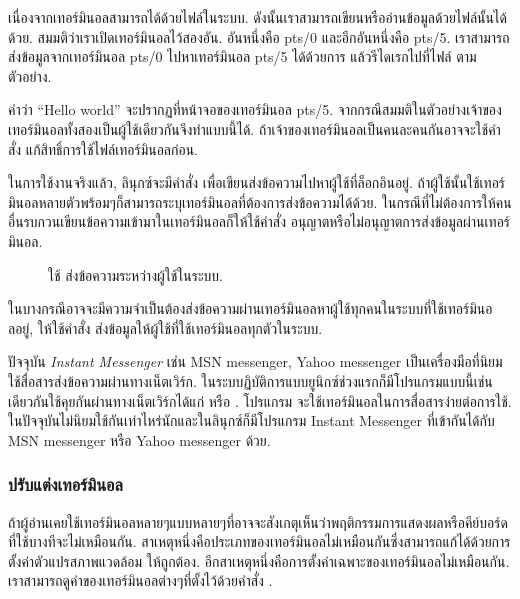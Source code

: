 \begin{thwbr}
เนื่องจากเทอร์มินอลสามารถได้ด้วยไฟล์ในระบบ. ดังนั้นเราสามารถเขียนหรืออ่านข้อมูลด้วยไฟล์นั้นได้ด้วย. สมมติว่าเราเปิดเทอร์มินอลไว้สองอัน. อันหนึ่งคือ pts/0 และอีกอันหนึ่งคือ pts/5. เราสามารถส่งข้อมูลจากเทอร์มินอล pts/0 ไปหาเทอร์มินอล pts/5 ได้ด้วยการ  แล้วรีไดเรกไปที่ไฟล์  ตามตัวอย่าง.
\begin{MyExample}
\end{MyExample}%
คำว่า ``Hello world'' จะปรากฏที่หน้าจอของเทอร์มินอล pts/5. จากกรณีสมมติในตัวอย่างเจ้าของเทอร์มินอลทั้งสองเป็นผู้ใช้เดียวกันจึงทำแบบนี้ได้. ถ้าเจ้าของเทอร์มินอลเป็นคนละคนกันอาจจะใช้คำสั่ง  แก้สิทธิ์การใช้ไฟล์เทอร์มินอลก่อน. 

ในการใช้งานจริงแล้ว, ลินุกซ์จะมีคำสั่ง  เพื่อเขียนส่งข้อความไปหาผู้ใช้ที่ล็อกอินอยู่. ถ้าผู้ใช้นั้นใช้เทอร์มินอลหลายตัวพร้อมๆก็สามารถระบุเทอร์มินอลที่ต้องการส่งข้อความได้ด้วย. ในกรณีที่ไม่ต้องการให้คนอื่นรบกวนเขียนข้อความเข้ามาในเทอร์มินอลก็ให้ใช้คำสั่ง  อนุญาตหรือไม่อนุญาตการส่งข้อมูลผ่านเทอร์มินอล.

\begin{figure}[!htb]

\vspace{10pt}
\caption{ใช้  ส่งข้อความระหว่างผู้ใช้ในระบบ.}\label{fig:write}
\end{figure}

ในบางกรณีอาจจะมีความจำเป็นต้องส่งข้อความผ่านเทอร์มินอลหาผู้ใช้ทุกคนในระบบที่ใช้เทอร์มินอลอยู่, ให้ใช้คำสั่ง  ส่งข้อมูลให้ผู้ใช้ที่ใช้เทอร์มินอลทุกตัวในระบบ.

\medskip
ปัจจุบัน \emph{Instant Messenger} เช่น MSN messenger, Yahoo messenger เป็นเครื่องมือที่นิยมใช้สื่อสารส่งข้อความผ่านทางเน็ตเวิร์ก. ในระบบฏิบัติการแบบยูนิกซ์ช่วงแรกก็มีโปรแกรมแบบนี้เช่นเดียวกันใช้คุยกันผ่านทางเน็ตเวิร์กได้แก่  หรือ . โปรแกรม  จะใช้เทอร์มินอลในการสื่อสารง่ายต่อการใช้. ในปัจจุบันไม่นิยมใช้กันเท่าไหร่นักและในลินุกซ์ก็มีโปรแกรม Instant Messenger ที่เข้ากันได้กับ MSN messenger หรือ Yahoo messenger ด้วย.

\subsubsection{ปรับแต่งเทอร์มินอล}
ถ้าผู้อ่านเคยใช้เทอร์มินอลหลายๆแบบหลายๆที่อาจจะสังเกตุเห็นว่าพฤติกรรมการแสดงผลหรือคีย์บอร์ดที่ใช้บางทีจะไม่เหมือนกัน. สาเหตุหนึ่งคือประเภทของเทอร์มินอลไม่เหมือนกันซึ่งสามารถแก้ได้ด้วยการตั้งค่าตัวแปรสภาพแวดล้อม  ให้ถูกต้อง. อีกสาเหตุหนึ่งคือการตั้งค่าเฉพาะของเทอร์มินอลไม่เหมือนกัน. เราสามารถดูค่าของเทอร์มินอลต่างๆที่ตั้งไว้ด้วยคำสั่ง .


\end{thwbr}
